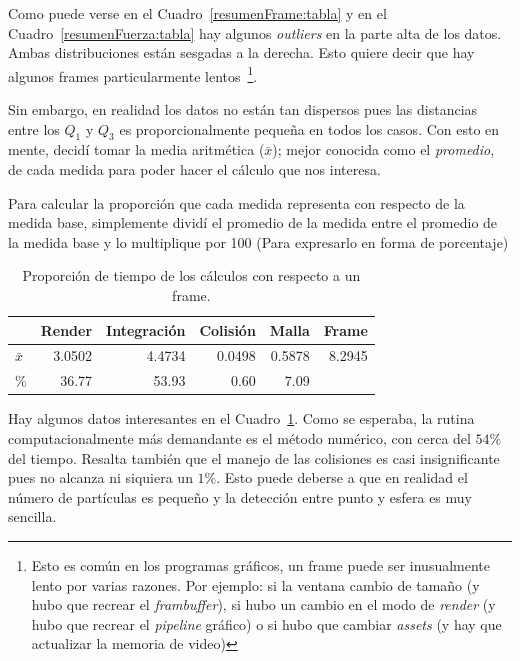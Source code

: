 Como puede verse en el Cuadro~\ref{resumenFrame:tabla} y en el Cuadro~\ref{resumenFuerza:tabla} hay algunos \emph{\textenglish{outliers}} en la parte alta de los datos.
Ambas distribuciones están sesgadas a la derecha.
Esto quiere decir que hay algunos frames particularmente lentos~\footnote{Esto es común en los programas gráficos, un frame puede ser inusualmente lento por varias razones. Por ejemplo: si la ventana cambio de tamaño (y hubo que recrear el \emph{\textenglish{frambuffer}}), si hubo un cambio en el modo de \emph{\textenglish{render}} (y hubo que recrear el \emph{\textenglish{pipeline}} gráfico) o si hubo que cambiar \emph{\textenglish{assets}} (y hay que actualizar la memoria de video)}.

Sin embargo, en realidad los datos no están tan dispersos pues las distancias entre los $Q_1$ y $Q_3$ es proporcionalmente pequeña en todos los casos.
Con esto en mente, decidí tomar la media aritmética ($\bar{x}$); mejor conocida como el \emph{promedio}, de cada medida para poder hacer el cálculo que nos interesa.

Para calcular la proporción que cada medida representa con respecto de la medida base, simplemente dividí el promedio de la medida entre el promedio de la medida base y lo multiplique por 100 (Para expresarlo en forma de porcentaje)


\begin{table}
\begin{center}
\begin{tabular} {@{}lrrrrr@{}}
\toprule
 & Render & Integración & Colisión & Malla & Frame \\
\midrule 
 $\bar{x}$      & 3.0502 & 4.4734 & 0.0498 & 0.5878 & 8.2945 \\
 $\%$           & 36.77 & 53.93 & 0.60 & 7.09 & \\
\bottomrule
\end{tabular}
\end{center}
\caption[Proporción de cálculos por frame]{Proporción de tiempo de los cálculos con respecto a un frame.}
\label{propFrame:tabla}
\end{table}

Hay algunos datos interesantes en el Cuadro~\ref{propFrame:tabla}.
Como se esperaba, la rutina computacionalmente más demandante es el método numérico, con cerca del $54\%$ del tiempo.
Resalta también que el manejo de las colisiones es casi insignificante pues no alcanza ni siquiera un $1\%$.
Esto puede deberse a que en realidad el número de partículas es pequeño y la detección entre punto y esfera es muy sencilla.

